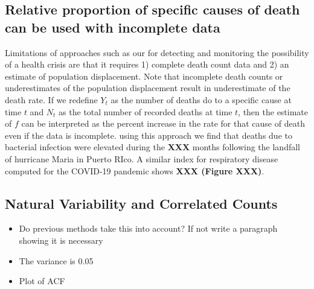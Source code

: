 \documentclass[11pt]{article}
\begin{document}

\subsection{Relative proportion of specific causes of death can be used with incomplete data}
\label{subsec:causes-deaths}
Limitations of approaches such as our for detecting and monitoring the possibility of a health crisis are that it requires 1) complete death count data and 2) an estimate of population displacement. Note that incomplete death counts or underestimates of the population displacement result in underestimate of the death rate. If we redefine $Y_t$ as the number of deaths do to a specific cause at time $t$ and $N_t$ as the total number of recorded deaths at time $t$, then the estimate of $f$ can be interpreted as the percent increase in the rate for that cause of death even if the data is incomplete. using this approach we find that deaths due to bacterial infection were elevated during the \textbf{XXX} months following the landfall of hurricane Maria in Puerto RIco. A similar index for respiratory disease computed for the COVID-19 pandemic shows \textbf{XXX (Figure XXX)}.

\subsection{Natural Variability and Correlated Counts}
\label{subsec:natural-variability}
\begin{itemize}
    \item Do previous methods take this into account? If not write a paragraph showing it is necessary
    \item The variance is 0.05
    \item Plot of ACF
\end{itemize}
\end{document}
